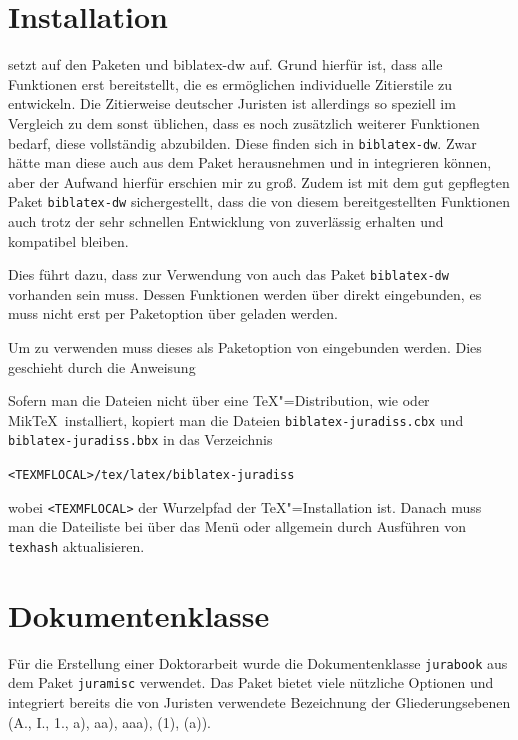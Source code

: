 \section{Installation}

\bibj setzt auf den Paketen \bib und biblatex-dw auf. Grund hierfür ist, dass \bib alle 
Funktionen erst bereitstellt, die es ermöglichen individuelle Zitierstile zu entwickeln. Die Zitierweise 
deutscher Juristen ist allerdings so speziell im Vergleich zu dem sonst üblichen, dass es noch 
zusätzlich weiterer Funktionen bedarf, diese vollständig abzubilden. Diese finden sich in 
\texttt{biblatex-dw}. 
Zwar hätte man diese auch aus dem Paket herausnehmen und in \bibj integrieren können, aber der 
Aufwand hierfür erschien mir zu groß. Zudem ist mit dem gut gepflegten Paket \texttt{biblatex-dw} 
sichergestellt, dass die von diesem bereitgestellten Funktionen auch trotz der sehr schnellen 
Entwicklung von \bib zuverlässig erhalten und kompatibel bleiben.

Dies führt dazu, dass zur Verwendung von \bibj auch das Paket \texttt{biblatex-dw} vorhanden sein 
muss. 
Dessen Funktionen werden über \bibj direkt eingebunden, es muss nicht erst per Paketoption über 
\bib geladen werden.

Um \bibj zu verwenden muss dieses als Paketoption von \bib eingebunden werden. Dies geschieht 
durch die Anweisung 


Sofern man die Dateien nicht über eine \TeX"=Distribution, wie \TeXLive oder Mik\TeX\ installiert, 
kopiert man die Dateien \texttt{biblatex-juradiss.cbx} und \texttt{biblatex-juradiss.bbx} in das
Verzeichnis

\texttt{<TEXMFLOCAL>/tex/latex/biblatex-juradiss}

wobei 
\texttt{<TEXMFLOCAL>} der Wurzelpfad der \TeX"=Installation ist. Danach muss man die Dateiliste 
bei \MiKTeX über das Menü oder allgemein durch Ausführen von \texttt{texhash} 
aktualisieren.


\section{Dokumentenklasse}


Für die Erstellung einer Doktorarbeit wurde die Dokumentenklasse \texttt{jurabook} aus dem 
Paket \texttt{juramisc} verwendet. Das Paket bietet viele nützliche Optionen und integriert bereits die 
von Juristen verwendete Bezeichnung der Gliederungsebenen (A., I., 1., a), aa), aaa), (1), (a)).

